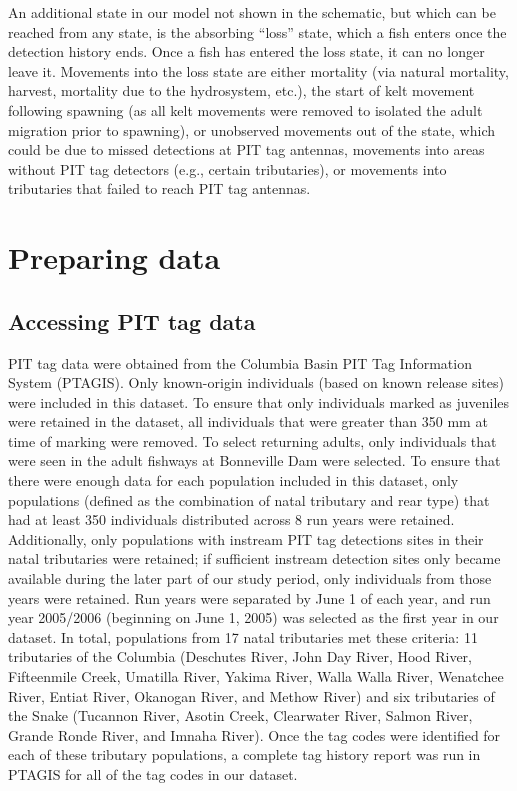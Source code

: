 \documentclass[
  12pt,
]{report}
\begin{document}
An additional state in our model not shown in the schematic, but which
can be reached from any state, is the absorbing ``loss'' state, which a
fish enters once the detection history ends. Once a fish has entered the
loss state, it can no longer leave it. Movements into the loss state are
either mortality (via natural mortality, harvest, mortality due to the
hydrosystem, etc.), the start of kelt movement following spawning (as
all kelt movements were removed to isolated the adult migration prior to
spawning), or unobserved movements out of the state, which could be due
to missed detections at PIT tag antennas, movements into areas without
PIT tag detectors (e.g., certain tributaries), or movements into
tributaries that failed to reach PIT tag antennas.

\hypertarget{preparing-data}{%
\section{Preparing data}\label{preparing-data}}

\hypertarget{accessing-pit-tag-data}{%
\subsection{Accessing PIT tag data}\label{accessing-pit-tag-data}}

PIT tag data were obtained from the Columbia Basin PIT Tag Information
System (PTAGIS). Only known-origin individuals (based on known release
sites) were included in this dataset. To ensure that only individuals
marked as juveniles were retained in the dataset, all individuals that
were greater than 350 mm at time of marking were removed. To select
returning adults, only individuals that were seen in the adult fishways
at Bonneville Dam were selected. To ensure that there were enough data
for each population included in this dataset, only populations (defined
as the combination of natal tributary and rear type) that had at least
350 individuals distributed across 8 run years were retained.
Additionally, only populations with instream PIT tag detections sites in
their natal tributaries were retained; if sufficient instream detection
sites only became available during the later part of our study period,
only individuals from those years were retained. Run years were
separated by June 1 of each year, and run year 2005/2006 (beginning on
June 1, 2005) was selected as the first year in our dataset. In total,
populations from 17 natal tributaries met these criteria: 11 tributaries
of the Columbia (Deschutes River, John Day River, Hood River,
Fifteenmile Creek, Umatilla River, Yakima River, Walla Walla River,
Wenatchee River, Entiat River, Okanogan River, and Methow River) and six
tributaries of the Snake (Tucannon River, Asotin Creek, Clearwater
River, Salmon River, Grande Ronde River, and Imnaha River). Once the tag
codes were identified for each of these tributary populations, a
complete tag history report was run in PTAGIS for all of the tag codes
in our dataset.
\end{document}
